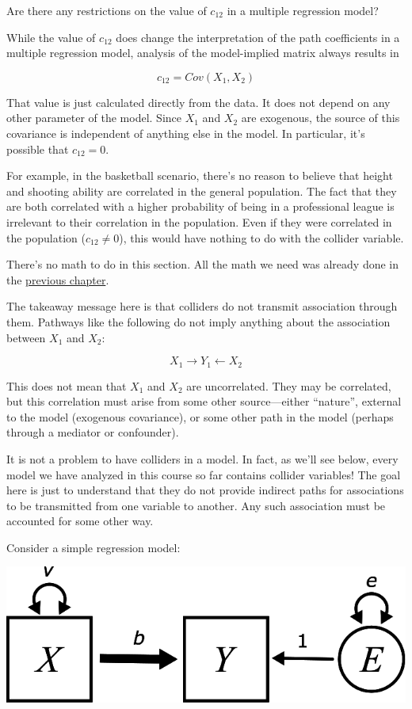 \documentclass[
]{book}
\begin{document}
Are there any restrictions on the value of \(c_{12}\) in a multiple regression model?

While the value of \(c_{12}\) does change the interpretation of the path coefficients in a multiple regression model, analysis of the model-implied matrix always results in

\[
c_{12} = Cov(X_{1}, X_{2})
\]

That value is just calculated directly from the data. It does not depend on any other parameter of the model. Since \(X_{1}\) and \(X_{2}\) are exogenous, the source of this covariance is independent of anything else in the model. In particular, it's possible that \(c_{12} = 0\).

For example, in the basketball scenario, there's no reason to believe that height and shooting ability are correlated in the general population. The fact that they are both correlated with a higher probability of being in a professional league is irrelevant to their correlation in the population. Even if they were correlated in the population (\(c_{12} \neq 0\)), this would have nothing to do with the collider variable.

There's no math to do in this section. All the math we need was already done in the \protect\hyperlink{multiple}{previous chapter}.

The takeaway message here is that colliders do not transmit association through them. Pathways like the following do not imply anything about the association between \(X_{1}\) and \(X_{2}\):

\[
X_{1} \boldsymbol{\rightarrow} Y_{1} \boldsymbol{\leftarrow} X_{2}
\]

This does not mean that \(X_{1}\) and \(X_{2}\) are uncorrelated. They may be correlated, but this correlation must arise from some other source---either ``nature'', external to the model (exogenous covariance), or some other path in the model (perhaps through a mediator or confounder).

It is not a problem to have colliders in a model. In fact, as we'll see below, every model we have analyzed in this course so far contains collider variables! The goal here is just to understand that they do not provide indirect paths for associations to be transmitted from one variable to another. Any such association must be accounted for some other way.

Consider a simple regression model:

\begin{center}\includegraphics{graphics/simple_regression_params} \end{center}
\end{document}
